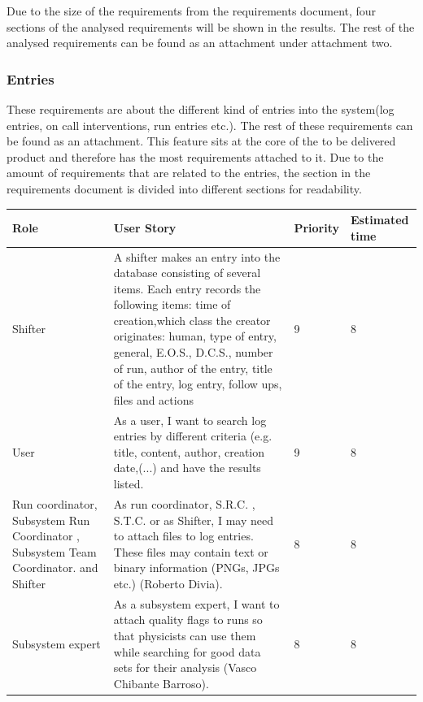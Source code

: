 \documentclass[paper=a4, fontsize=11pt,twoside]{scrartcl}	%
\begin{document}
Due to the size of the requirements from the requirements document, four sections of the analysed requirements will be shown in the results. The rest of the analysed requirements can be found as an attachment under attachment two.\\

\subsubsection{Entries}
These requirements are about the different kind of entries into the system(log entries, on call interventions, run entries etc.). The rest of these requirements can be found as an attachment. This feature sits at the core of the to be delivered product and therefore has the most requirements attached to it. Due to the amount of requirements that are related to the entries, the section in the requirements document is divided into different sections for readability.

\begin{longtable}{ | p{3cm} | p{8cm} | p{1.5cm} | l |}
\hline
Role & User Story & Priority & Estimated time \\ \hline
Shifter &  A shifter makes an entry into the database consisting of several items. Each entry records the following items: time of creation,which class the creator originates: human, type of entry, general, E.O.S., D.C.S., number of run, author of the entry, title of the entry, log entry, follow ups, files and actions & 9 & 8 \\ \hline
User & As a user, I want to search log entries by different criteria (e.g. title, content, author, creation date,(...) and have the results listed. & 9 & 8 \\ \hline
Run coordinator, Subsystem Run Coordinator , Subsystem Team Coordinator. and Shifter& As run coordinator, S.R.C. , S.T.C. or as Shifter, I may need to attach files to log entries. These files may contain text or binary information (PNGs, JPGs etc.) (Roberto Divia). & 8 & 8 \\ \hline
Subsystem expert & As a subsystem expert, I want to attach quality flags to runs so that
physicists can use them while searching for good data sets for their analysis (Vasco Chibante Barroso). & 8 & 8 \\ \hline
\end{longtable}
\end{document}
